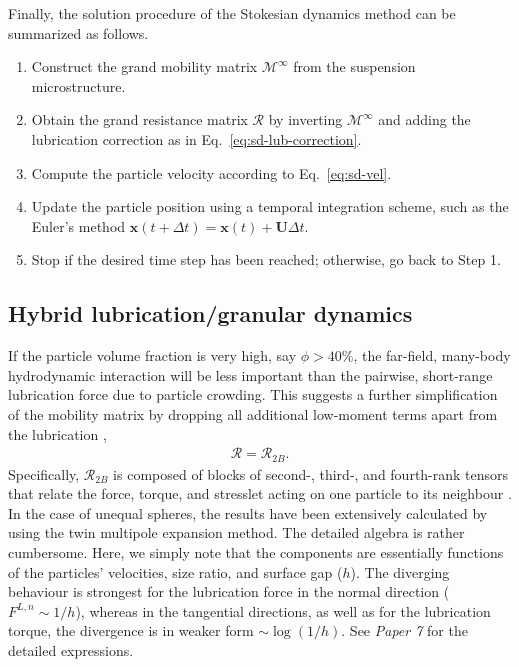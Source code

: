 Finally, the solution procedure of the Stokesian dynamics method can be summarized as follows.
\begin{enumerate}
\item Construct the grand mobility matrix $\mathscr{M}^\infty$ from the suspension microstructure.
\item Obtain the grand resistance matrix $\mathscr{R}$ by inverting $\mathscr{M}^\infty$ and adding the lubrication correction as in Eq.\ \eqref{eq:sd-lub-correction}.
\item Compute the particle velocity according to Eq.\ \eqref{eq:sd-vel}.
\item Update the particle position using a temporal integration scheme, such as the Euler's method $\bm{x}(t+\Delta t)= \bm{x}(t) +\bm{U} \Delta t$.
\item Stop if the desired time step has been reached; otherwise, go back to Step 1.
\end{enumerate}


\subsection{Hybrid lubrication/granular dynamics}

If the particle volume fraction is very high, say $\phi > 40\%$, the far-field, many-body hydrodynamic interaction will be less important than the pairwise, short-range lubrication force due to particle crowding. This suggests a further simplification of the mobility matrix by dropping all additional low-moment terms apart from the lubrication \citep{Ball_Melrose_1997}, \ie
\begin{equation} 
 \begin{aligned}
  \mathscr{R} = \mathscr{R}_{2B} .
 \end{aligned}
\end{equation}
Specifically, $\mathscr{R}_{2B}$ is composed of blocks of second-, third-, and fourth-rank tensors that relate the force, torque, and stresslet acting on one particle to its neighbour \citep{kim_karrila}.
In the case of unequal spheres, the results have been extensively calculated by \cite{jeffrey_onishi_1984, jeffrey1992} using the twin multipole expansion method.
The detailed algebra is rather cumbersome. Here, we simply note that the components are essentially functions of the particles' velocities, size ratio, and surface gap ($h$). The diverging behaviour is strongest for the lubrication force in the normal direction ($F^{L,n} \sim 1/h$), whereas in the tangential directions, as well as for the lubrication torque, the divergence is in weaker form $\sim \log(1/h)$. See \emph{Paper 7} for the detailed expressions.

